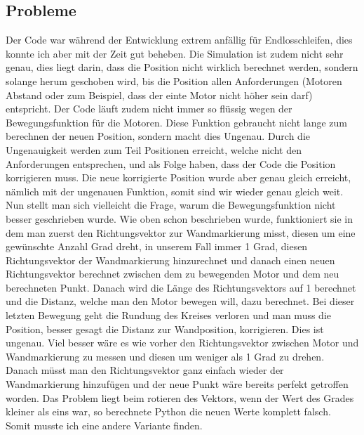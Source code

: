 \documentclass[12pt]{article}
\begin{document}
\subsection{Probleme}
Der Code war während der Entwicklung extrem anfällig für Endlosschleifen, dies konnte ich aber mit der Zeit gut beheben. Die Simulation ist zudem nicht sehr genau, dies liegt darin, dass die Position nicht wirklich berechnet werden, sondern solange herum geschoben wird, bis die Position allen Anforderungen (Motoren Abstand oder zum Beispiel, dass der einte Motor nicht höher sein darf) entspricht. Der Code läuft zudem nicht immer so flüssig wegen der Bewegungsfunktion für die Motoren. Diese Funktion gebraucht nicht lange zum berechnen der neuen Position, sondern macht dies Ungenau. Durch die Ungenauigkeit werden zum Teil Positionen erreicht, welche nicht den Anforderungen entsprechen, und als Folge haben, dass der Code die Position korrigieren muss. Die neue korrigierte Position wurde aber genau gleich erreicht, nämlich mit der ungenauen Funktion, somit sind wir wieder genau gleich weit. Nun stellt man sich vielleicht die Frage, warum die Bewegungsfunktion nicht besser geschrieben wurde. Wie oben schon beschrieben wurde, funktioniert sie in dem man zuerst den Richtungsvektor zur Wandmarkierung misst, diesen um eine gewünschte Anzahl Grad dreht, in unserem Fall immer 1 Grad, diesen Richtungsvektor der Wandmarkierung hinzurechnet und danach einen neuen Richtungsvektor berechnet zwischen dem zu bewegenden Motor und dem neu berechneten Punkt. Danach wird die Länge des Richtungsvektors auf 1 berechnet und die Distanz, welche man den Motor bewegen will, dazu berechnet. Bei dieser letzten Bewegung geht die Rundung des Kreises verloren und man muss die Position, besser gesagt die Distanz zur Wandposition, korrigieren. Dies ist ungenau. Viel besser wäre es wie vorher den Richtungsvektor zwischen Motor und Wandmarkierung zu messen und diesen um weniger als 1 Grad zu drehen. Danach müsst man den Richtungsvektor ganz einfach wieder der Wandmarkierung hinzufügen und der neue Punkt wäre bereits perfekt getroffen worden. Das Problem liegt beim rotieren des Vektors, wenn der Wert des Grades kleiner als eins war, so berechnete Python die neuen Werte komplett falsch. Somit musste ich eine andere Variante finden.
\end{document}
